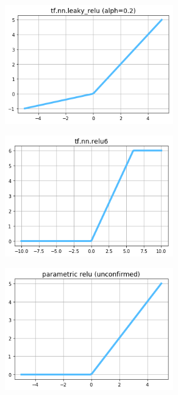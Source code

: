 \begin{figure}
\centering
\includegraphics[width=0.65\textwidth]{./sync_imgs/act/notsmooth/leakyrelu.png}
\label{fig:act_notsmooth_leakyrelu}
\end{figure}

\begin{figure}
\centering
\includegraphics[width=0.65\textwidth]{./sync_imgs/act/notsmooth/relu6.png}
\label{fig:act_notsmooth_relu6}
\end{figure}

\begin{figure}
\centering
\includegraphics[width=0.65\textwidth]{./sync_imgs/act/notsmooth/prelu.png}
\label{fig:act_notsmooth_prelu}
\end{figure}

